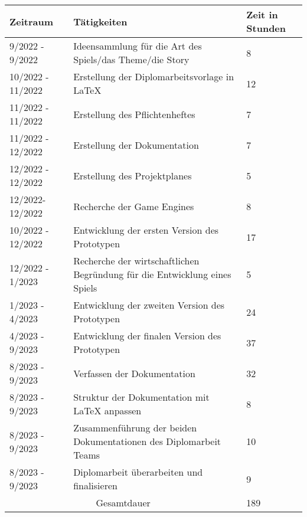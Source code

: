 \begin{tabular}{|m{}|m{}|m{}|}
    \hline
    \cellcolor{gray!10} Zeitraum & \cellcolor{gray!10} Tätigkeiten & \cellcolor{gray!10} Zeit in Stunden \\
    \hline
    9/2022 - 9/2022 & Ideensammlung für die Art des Spiels/das Theme/die Story & 8 \\
    \hline
    10/2022 - 11/2022 & Erstellung der Diplomarbeitsvorlage in LaTeX & 12 \\
    \hline
    11/2022 - 11/2022 & Erstellung des Pflichtenheftes & 7 \\
    \hline
    11/2022 - 12/2022 & Erstellung der Dokumentation & 7 \\
    \hline
    12/2022 - 12/2022 & Erstellung des Projektplanes & 5 \\
    \hline
    12/2022- 12/2022 & Recherche der Game Engines & 8 \\
    \hline
    10/2022 - 12/2022 & Entwicklung der ersten Version des Prototypen & 17 \\
    \hline
    12/2022 - 1/2023 & Recherche der wirtschaftlichen Begründung für die Entwicklung eines Spiels & 5 \\
    \hline
    1/2023 - 4/2023 & Entwicklung der zweiten Version des Prototypen & 24 \\
    \hline
    4/2023 - 9/2023 & Entwicklung der finalen Version des Prototypen & 37 \\
    \hline
    8/2023 - 9/2023 & Verfassen der Dokumentation & 32 \\
    \hline
    8/2023 - 9/2023 & Struktur der Dokumentation mit LaTeX anpassen & 8 \\
    \hline
    8/2023 - 9/2023 & Zusammenführung der beiden Dokumentationen des Diplomarbeit Teams & 10 \\
    \hline
    8/2023 - 9/2023 & Diplomarbeit überarbeiten und finalisieren & 9 \\
    \hline
    \multicolumn{2}{|c|}{\cellcolor{gray!30}Gesamtdauer} & 189 \\
    \hline
\end{tabular}


\pagebreak
